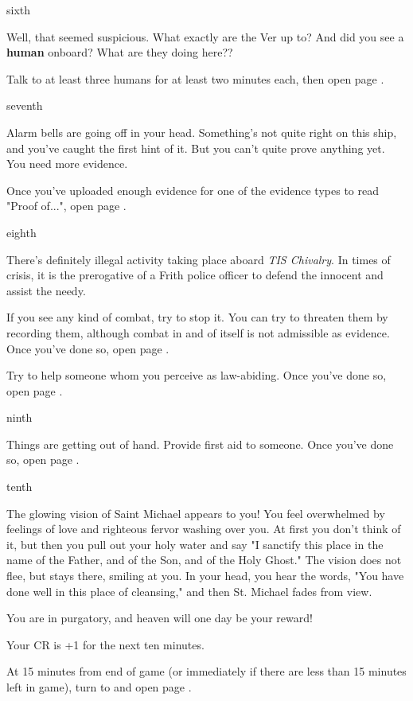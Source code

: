 \documentclass[greennotebook]{guildcamp4} %
\begin{document}
\begin{page}{sixth}

Well, that seemed suspicious. What exactly are the Ver up to? And did you see a {\bf human} onboard? What are they doing here??

Talk to at least three humans for at least two minutes each, then open page .

\end{page}

\begin{page}{seventh}

Alarm bells are going off in your head. Something's not quite right on this ship, and you've caught the first hint of it. But you can't quite prove anything yet. You need more evidence.

Once you've uploaded enough evidence for one of the evidence types to read "Proof of...", open page .

\end{page}

\begin{page}{eighth}

There's definitely illegal activity taking place aboard \emph {TIS Chivalry}. In times of crisis, it is the prerogative of a Frith police officer to defend the innocent and assist the needy.

If you see any kind of combat, try to stop it. You can try to threaten them by recording them, although combat in and of itself is not admissible as evidence. Once you've done so, open page .

Try to help someone whom you perceive as law-abiding. Once you've done so, open page .

\end{page}

\begin{page}{ninth}

Things are getting out of hand. Provide first aid to someone. Once you've done so, open page .

\end{page}

\begin{page}{tenth}


The glowing vision of Saint Michael appears to you! You feel overwhelmed by feelings of love and righteous fervor washing over you. At first you don't think of it, but then you pull out your holy water and say "I sanctify this place in the name of the Father, and of the Son, and of the Holy Ghost." The vision does not flee, but stays there, smiling at you. In your head, you hear the words, "You have done well in this place of cleansing," and then St. Michael fades from view. 

You are in purgatory, and heaven will one day be your reward!

Your CR is +1 for the next ten minutes.

At 15 minutes from end of game (or immediately if there are less than 15 minutes left in game), turn to and open page .

\end{page}
\end{document}
